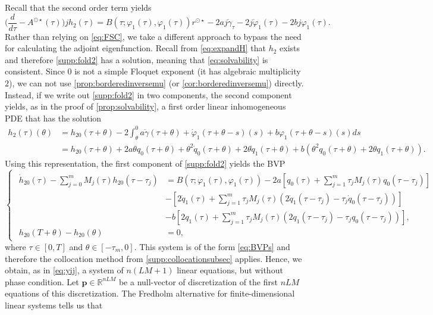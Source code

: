 \documentclass[english]{myarticle}
\begin{document}
\begin{sloppypar}
Recall that the second order term yields
\begin{equation} \label{supp:fold2}
    \bigg(\frac{d}{d \tau} - A^{\odot \star}(\tau) \bigg)jh_2(\tau) = B(\tau;\varphi_1(\tau),\varphi_1(\tau))r^{\odot \star} - 2aj\dot{\gamma}_\tau - 2j\dot{\varphi}_1(\tau) - 2bj\varphi_1(\tau).
\end{equation}
Rather than relying on \eqref{eq:FSC}, we take a different approach to bypass the need for calculating the adjoint eigenfunction. Recall from \eqref{eq:expandH} that $h_2$ exists and therefore \eqref{supp:fold2} has a solution, meaning that \eqref{eq:solvability} is consistent. Since $0$ is not a simple Floquet exponent (it has algebraic multiplicity $2$), we can not use \cref{prop:borderedinversemu} (or \cref{cor:borderedinversemu}) directly. Instead, if we write out \eqref{supp:fold2} in two components, the second component yields, as in the proof of \cref{prop:solvability}, a first order linear inhomogeneous PDE that has the solution
\begin{align*}
    h_2(\tau)(\theta) &= h_{20}(\tau+\theta) - 2 \int_{\theta}^0 a \dot{\gamma}(\tau+\theta) + \dot{\varphi}_1(\tau+\theta-s)(s) + b \varphi_1(\tau+\theta-s)(s) ds \\
    &= h_{20}(\tau+\theta) + 2a\theta q_0(\tau+\theta) + \theta^2 \dot{q}_0(\tau + \theta) + 2\theta\dot{q}_1(\tau + \theta) + b(\theta^2 q_0(\tau + \theta) + 2\theta q_1(\tau + \theta)).
\end{align*}
Using this representation, the first component of \eqref{supp:fold2} yields the BVP
\begin{equation*}
   \begin{cases}
    \begin{aligned}
    \dot{h}_{20}(\tau) - \textstyle\sum_{j=0}^m M_j(\tau)h_{20}(\tau-\tau_j) &= B(\tau;\varphi_1(\tau),\varphi_1(\tau)) - 2a[q_0(\tau) + \textstyle\sum_{j=1}^m \tau_j M_j(\tau) q_0(\tau-\tau_j)]\\
    & -[2\dot{q}_1(\tau) + \textstyle\sum_{j=1}^m \tau_j M_j(\tau)(2\dot{q}_1(\tau-\tau_j)-\tau_j \dot{q}_0(\tau-\tau_j))] \\
    & -b[2{q}_1(\tau) + \textstyle\sum_{j=1}^m \tau_j M_j(\tau) (2{q}_1(\tau-\tau_j)-\tau_j {q}_0(\tau-\tau_j))],\\
    h_{20}(T + \theta) - h_{20}(\theta) &= 0,
    \end{aligned}    
    \end{cases}
\end{equation*}
where $\tau \in [0,T]$ and $\theta \in [-\tau_m,0]$. This system is of the form \eqref{eq:BVPs} and therefore the collocation method from \cref{supp:collocationsubsec} applies. Hence, we obtain, as in \eqref{eq:yij}, a system of $n(LM+1)$ linear equations, but without phase condition. Let $\mathbf{p} \in \mathbb{R}^{nLM}$ be a null-vector of discretization of the first $nLM$ equations of this discretization. The Fredholm alternative for finite-dimensional linear systems tells us that

\end{sloppypar}
\end{document}
